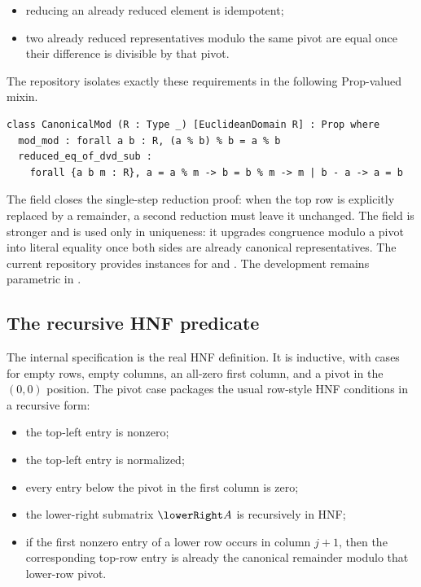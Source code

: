 \begin{itemize}
  \item reducing an already reduced element is idempotent;
  \item two already reduced representatives modulo the same pivot are equal once
    their difference is divisible by that pivot.
\end{itemize}

The repository isolates exactly these requirements in the following
Prop-valued mixin.

\begin{lstlisting}[style=leanstyle,caption={The \code{CanonicalMod} boundary.},label={lst:canonicalmod}]
class CanonicalMod (R : Type _) [EuclideanDomain R] : Prop where
  mod_mod : forall a b : R, (a % b) % b = a % b
  reduced_eq_of_dvd_sub :
    forall {a b m : R}, a = a % m -> b = b % m -> m | b - a -> a = b
\end{lstlisting}

The field  closes the single-step reduction proof: when the top
row is explicitly replaced by a remainder, a second reduction must leave it
unchanged. The field  is stronger and is used
only in uniqueness: it upgrades congruence modulo a pivot into literal equality
once both sides are already canonical representatives. The current repository
provides instances for  and . The development
remains parametric in \code{[CanonicalMod R]}.

\subsection{The recursive HNF predicate}

The internal specification  is the real HNF
definition. It is inductive, with cases for empty rows, empty columns, an all-zero
first column, and a pivot in the \((0,0)\) position. The pivot case packages the
usual row-style HNF conditions in a recursive form:

\begin{itemize}
  \item the top-left entry is nonzero;
  \item the top-left entry is normalized;
  \item every entry below the pivot in the first column is zero;
  \item the lower-right submatrix \(\lowerRight A\) is recursively in HNF;
  \item if the first nonzero entry of a lower row occurs in column \(j+1\), then
    the corresponding top-row entry is already the canonical remainder modulo
    that lower-row pivot.
\end{itemize}

